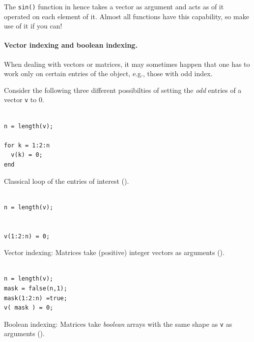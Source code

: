 The \lstinline!sin()! function in \matlab{} hence takes a vector as argument and acts as of it operated on each element of it. Almost all \matlab{} functions have this capability, so make use of it if you can!


\paragraph{Vector indexing and boolean indexing.}\label{sec:logicalIndexing}
When dealing with vectors or matrices, it may sometimes happen that one has to work only on certain entries of the object, e.g., those with odd index.

Consider the following three different possibilties of setting the \emph{odd} entries of a vector \lstinline!v! to $0$.

\hfill
\begin{minipage}[t]{.29\textwidth}
\begin{lstlisting}[framerule=1pt,rulecolor=\color{goodgreen}]
% [...] create v

n = length(v);

for k = 1:2:n
  v(k) = 0;
end
\end{lstlisting}
Classical loop of the entries of interest ().
\end{minipage}
\hfill
\begin{minipage}[t]{.29\textwidth}
\begin{lstlisting}[framerule=1pt,rulecolor=\color{mediocre}]
% [...] create v

n = length(v);


v(1:2:n) = 0;

\end{lstlisting}
Vector indexing: Matrices take (positive) integer vectors as arguments ().
\end{minipage}
\hfill
\begin{minipage}[t]{.29\textwidth}
\begin{lstlisting}[framerule=1pt,rulecolor=\color{badred}]
% [...] create v

n = length(v);
mask = false(n,1);
mask(1:2:n) =true;
v( mask ) = 0;

\end{lstlisting}
Boolean indexing: Matrices take \emph{boolean} arrays\footnotemark{} with the same shape as \lstinline!v! as arguments ().
\end{minipage}
\hfill
{}

